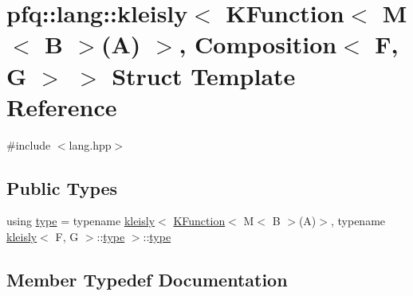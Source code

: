 \hypertarget{structpfq_1_1lang_1_1kleisly_3_01KFunction_3_01M_3_01B_01_4_07A_08_01_4_00_01Composition_3_01F_00_01G_01_4_01_4}{}\section{pfq\+:\+:lang\+:\+:kleisly$<$ K\+Function$<$ M$<$ B $>$(A) $>$, Composition$<$ F, G $>$ $>$ Struct Template Reference}
\label{structpfq_1_1lang_1_1kleisly_3_01KFunction_3_01M_3_01B_01_4_07A_08_01_4_00_01Composition_3_01F_00_01G_01_4_01_4}


{\ttfamily \#include $<$lang.\+hpp$>$}

\subsection*{Public Types}
\begin{DoxyCompactItemize}
\item 
using \hyperlink{structpfq_1_1lang_1_1kleisly_3_01KFunction_3_01M_3_01B_01_4_07A_08_01_4_00_01Composition_3_01F_00_01G_01_4_01_4_ae7adb22d85d77fbfa69697dcfb2530f3}{type} = typename \hyperlink{structpfq_1_1lang_1_1kleisly}{kleisly}$<$ \hyperlink{structpfq_1_1lang_1_1KFunction}{K\+Function}$<$ M$<$ B $>$(A)$>$, typename \hyperlink{structpfq_1_1lang_1_1kleisly}{kleisly}$<$ F, G $>$\+::\hyperlink{structpfq_1_1lang_1_1kleisly_3_01KFunction_3_01M_3_01B_01_4_07A_08_01_4_00_01Composition_3_01F_00_01G_01_4_01_4_ae7adb22d85d77fbfa69697dcfb2530f3}{type} $>$\+::\hyperlink{structpfq_1_1lang_1_1kleisly_3_01KFunction_3_01M_3_01B_01_4_07A_08_01_4_00_01Composition_3_01F_00_01G_01_4_01_4_ae7adb22d85d77fbfa69697dcfb2530f3}{type}
\end{DoxyCompactItemize}


\subsection{Member Typedef Documentation}
